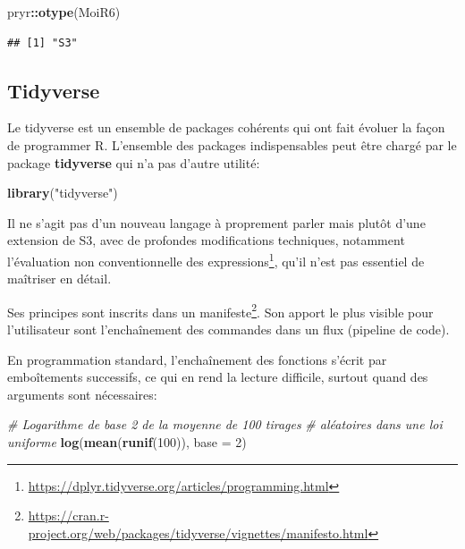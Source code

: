 \documentclass[
  12pt,
  french,
  a4paper,
  extrafontsizes,onecolumn,openright
  ]{memoir}
\newenvironment{Shaded}{\begin{snugshade}}{\end{snugshade}}
\newcommand{\CommentTok}[1]{\textcolor[rgb]{0.56,0.35,0.01}{\textit{#1}}}
\newcommand{\DataTypeTok}[1]{\textcolor[rgb]{0.13,0.29,0.53}{#1}}
\newcommand{\DecValTok}[1]{\textcolor[rgb]{0.00,0.00,0.81}{#1}}
\newcommand{\KeywordTok}[1]{\textcolor[rgb]{0.13,0.29,0.53}{\textbf{#1}}}
\newcommand{\NormalTok}[1]{#1}
\newcommand{\OperatorTok}[1]{\textcolor[rgb]{0.81,0.36,0.00}{\textbf{#1}}}
\newcommand{\StringTok}[1]{\textcolor[rgb]{0.31,0.60,0.02}{#1}}
\begin{document}
\scriptsize

\begin{Shaded}
\begin{Highlighting}[]
\NormalTok{pryr}\OperatorTok{::}\KeywordTok{otype}\NormalTok{(MoiR6)}
\end{Highlighting}
\end{Shaded}

\begin{verbatim}
## [1] "S3"
\end{verbatim}

\normalsize

\hypertarget{tidyverse}{%
\subsection{Tidyverse}\label{tidyverse}}

Le tidyverse est un ensemble de packages cohérents qui ont fait évoluer la façon de programmer R.
L'ensemble des packages indispensables peut être chargé par le package \textbf{tidyverse} qui n'a pas d'autre utilité:

\scriptsize

\begin{Shaded}
\begin{Highlighting}[]
\KeywordTok{library}\NormalTok{(}\StringTok{"tidyverse"}\NormalTok{)}
\end{Highlighting}
\end{Shaded}

\normalsize

Il ne s'agit pas d'un nouveau langage à proprement parler mais plutôt d'une extension de S3, avec de profondes modifications techniques, notamment l'évaluation non conventionnelle des expressions\footnote{\url{https://dplyr.tidyverse.org/articles/programming.html}}, qu'il n'est pas essentiel de maîtriser en détail.

Ses principes sont inscrits dans un manifeste\footnote{\url{https://cran.r-project.org/web/packages/tidyverse/vignettes/manifesto.html}}.
Son apport le plus visible pour l'utilisateur sont l'enchaînement des commandes dans un flux (pipeline de code).

En programmation standard, l'enchaînement des fonctions s'écrit par emboîtements successifs, ce qui en rend la lecture difficile, surtout quand des arguments sont nécessaires:

\scriptsize

\begin{Shaded}
\begin{Highlighting}[]
\CommentTok{# Logarithme de base 2 de la moyenne de 100 tirages}
\CommentTok{# aléatoires dans une loi uniforme}
\KeywordTok{log}\NormalTok{(}\KeywordTok{mean}\NormalTok{(}\KeywordTok{runif}\NormalTok{(}\DecValTok{100}\NormalTok{)), }\DataTypeTok{base =} \DecValTok{2}\NormalTok{)}
\end{Highlighting}
\end{Shaded}
\end{document}
